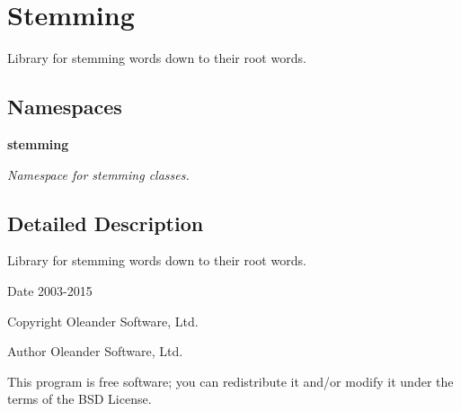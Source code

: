 \section{Stemming}
\label{group___stemming}


Library for stemming words down to their root words.  


\subsection*{Namespaces}
\begin{DoxyCompactItemize}
\item 
 {\bf stemming}
\begin{DoxyCompactList}\small\item\em Namespace for stemming classes. \end{DoxyCompactList}\end{DoxyCompactItemize}


\subsection{Detailed Description}
Library for stemming words down to their root words. 

\begin{DoxyDate}{Date}
2003-\/2015 
\end{DoxyDate}
\begin{DoxyCopyright}{Copyright}
Oleander Software, Ltd. 
\end{DoxyCopyright}
\begin{DoxyAuthor}{Author}
Oleander Software, Ltd.
\end{DoxyAuthor}
This program is free software; you can redistribute it and/or modify it under the terms of the B\+SD License. 